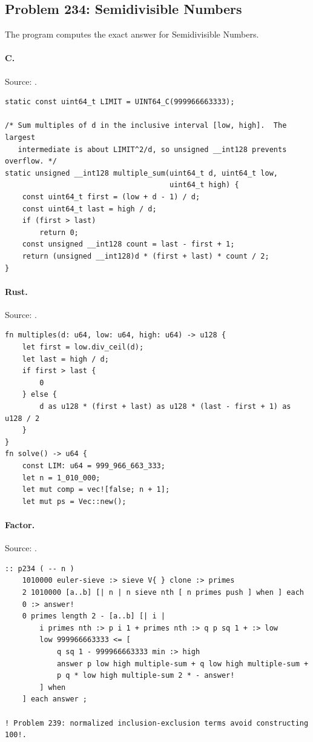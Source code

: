 \subsection{Problem 234: Semidivisible Numbers}
\label{walkthrough:p234}
The program computes the exact answer for Semidivisible Numbers.

\paragraph{C.} Source: .
\begin{lstlisting}
static const uint64_t LIMIT = UINT64_C(999966663333);

/* Sum multiples of d in the inclusive interval [low, high].  The largest
   intermediate is about LIMIT^2/d, so unsigned __int128 prevents overflow. */
static unsigned __int128 multiple_sum(uint64_t d, uint64_t low,
                                      uint64_t high) {
    const uint64_t first = (low + d - 1) / d;
    const uint64_t last = high / d;
    if (first > last)
        return 0;
    const unsigned __int128 count = last - first + 1;
    return (unsigned __int128)d * (first + last) * count / 2;
}
\end{lstlisting}

\paragraph{Rust.} Source: .
\begin{lstlisting}
fn multiples(d: u64, low: u64, high: u64) -> u128 {
    let first = low.div_ceil(d);
    let last = high / d;
    if first > last {
        0
    } else {
        d as u128 * (first + last) as u128 * (last - first + 1) as u128 / 2
    }
}
fn solve() -> u64 {
    const LIM: u64 = 999_966_663_333;
    let n = 1_010_000;
    let mut comp = vec![false; n + 1];
    let mut ps = Vec::new();
\end{lstlisting}

\paragraph{Factor.} Source: .
\begin{lstlisting}
:: p234 ( -- n )
    1010000 euler-sieve :> sieve V{ } clone :> primes
    2 1010000 [a..b] [| n | n sieve nth [ n primes push ] when ] each
    0 :> answer!
    0 primes length 2 - [a..b] [| i |
        i primes nth :> p i 1 + primes nth :> q p sq 1 + :> low
        low 999966663333 <= [
            q sq 1 - 999966663333 min :> high
            answer p low high multiple-sum + q low high multiple-sum +
            p q * low high multiple-sum 2 * - answer!
        ] when
    ] each answer ;

! Problem 239: normalized inclusion-exclusion terms avoid constructing 100!.
\end{lstlisting}

